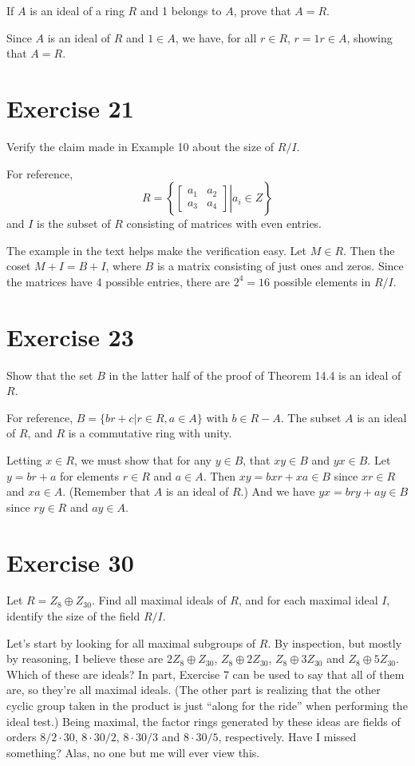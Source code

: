 \documentclass[12pt]{article}
\begin{document}
If $A$ is an ideal of a ring $R$ and 1 belongs to $A$, prove that $A=R$.

Since $A$ is an ideal of $R$ and $1\in A$, we have, for all $r\in R$, $r=1r\in A$,
showing that $A=R$.

\section*{Exercise 21}

Verify the claim made in Example 10 about the size of $R/I$.

For reference,
\begin{equation*}
R=\left\{\left.\left[\begin{array}{cc}a_1&a_2\\a_3&a_4\end{array}\right]\right|a_i\in Z\right\}
\end{equation*}
and $I$ is the subset of $R$ consisting of matrices with even entries.

The example in the text helps make the verification easy.  Let $M\in R$.
Then the coset $M+I=B+I$, where $B$ is a matrix consisting of just ones
and zeros.  Since the matrices have 4 possible entries, there are $2^4=16$
possible elements in $R/I$.

\section*{Exercise 23}

Show that the set $B$ in the latter half of the proof of Theorem 14.4 is an
ideal of $R$.

For reference, $B=\{br+c|r\in R, a\in A\}$ with $b\in R-A$.  The subset $A$ is an ideal
of $R$, and $R$ is a commutative ring with unity.

Letting $x\in R$, we must show that for any $y\in B$, that $xy\in B$ and $yx\in B$.
Let $y=br+a$ for elements $r\in R$ and $a\in A$.
Then $xy=bxr+xa\in B$ since $xr\in R$ and $xa\in A$.  (Remember that $A$ is
an ideal of $R$.)  And we have $yx=bry+ay\in B$ since $ry\in R$ and $ay\in A$.

\section*{Exercise 30}

Let $R=Z_8\oplus Z_{30}$.  Find all maximal ideals of $R$, and for each
maximal ideal $I$, identify the size of the field $R/I$.

Let's start by looking for all maximal subgroups of $R$.
By inspection, but mostly by reasoning, I believe these are $2Z_8\oplus Z_{30}$, $Z_8\oplus 2Z_{30}$,
$Z_8\oplus 3Z_{30}$ and $Z_8\oplus 5Z_{30}$.  Which of these
are ideals?  In part, Exercise 7 can be used to say that all of them are, so
they're all maximal ideals.
(The other part is realizing that the other cyclic group taken in the
product is just ``along for the ride'' when performing the ideal test.)
Being maximal, the factor rings generated by these ideas are fields
of orders $8/2\cdot 30$, $8\cdot 30/2$, $8\cdot 30/3$ and $8\cdot 30/5$,
respectively.  Have I missed something?  Alas, no one but me will ever view this.
\end{document}
